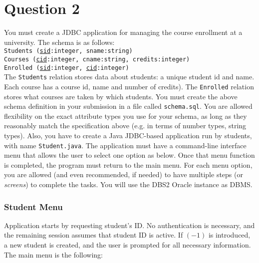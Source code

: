 
\section*{Question 2}

You must create a JDBC application for managing the course enrollment at a university.
The schema is as follows:\\

\texttt{Students (\underline{sid}:integer, sname:string)}\\
\texttt{Courses (\underline{cid}:integer, cname:string, credits:integer)}\\
\texttt{Enrolled (\underline{sid}:integer, \underline{cid}:integer)}\\

The \texttt{Students} relation stores data about students: a unique student id and name.
Each course has a course id, name and number of credits).
The \texttt{Enrolled} relation stores what courses are taken by which students.
You must create the above schema definition in your submission in a file called \texttt{schema.sql}.
You are allowed flexibility on the exact attribute types you use for your schema, as long as they reasonably match the specification above (e.g. in terms of number types, string types).
Also, you have to create a Java JDBC-based application run by students, with name \texttt{Student.java}.
The application must have a command-line interface menu that allows the user to select one option as below.
Once that menu function is completed, the program must return to the main menu.
For each menu option, you are allowed (and even recommended, if needed) to have multiple steps (or \textit{screens}) to complete the tasks.
You will use the DBS2 Oracle instance as DBMS.

\subsubsection*{Student Menu}

Application starts by requesting student's ID.
No authentication is necessary, and the remaining session assumes that student ID is active.
If $(-1)$ is  introduced, a new student is created, and the user is prompted for all necessary information.
The main menu is the following:

